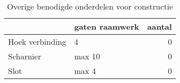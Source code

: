 \begin{table}[h!]
\centering
\caption{Overige benodigde onderdelen voor constructie}
\begin{tabular}{llr}
\toprule
{} & gaten raamwerk &  aantal \\
\midrule
Hoek verbinding &              4 &       0 \\
Scharnier       &         max 10 &       0 \\
Slot            &          max 4 &       0 \\
\bottomrule
\end{tabular}
\end{table}
